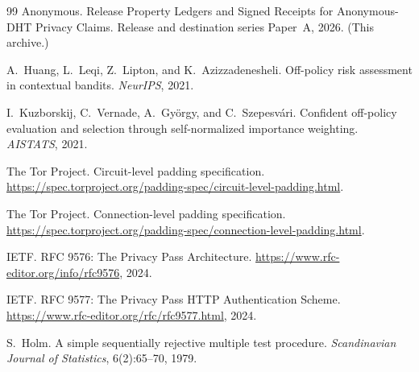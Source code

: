 \documentclass[11pt]{article}
\begin{document}
\begin{thebibliography}{99}
Anonymous.
\newblock Release Property Ledgers and Signed Receipts for Anonymous-DHT Privacy Claims.
\newblock Release and destination series Paper~A, 2026. (This archive.)


A.~Huang, L.~Leqi, Z.~Lipton, and K.~Azizzadenesheli.
\newblock Off-policy risk assessment in contextual bandits.
\newblock \emph{NeurIPS}, 2021.

I.~Kuzborskij, C.~Vernade, A.~Gy\"orgy, and C.~Szepesv\'ari.
\newblock Confident off-policy evaluation and selection through self-normalized importance weighting.
\newblock \emph{AISTATS}, 2021.

The Tor Project.
\newblock Circuit-level padding specification.
\newblock \url{https://spec.torproject.org/padding-spec/circuit-level-padding.html}.

The Tor Project.
\newblock Connection-level padding specification.
\newblock \url{https://spec.torproject.org/padding-spec/connection-level-padding.html}.

IETF.
\newblock RFC 9576: The Privacy Pass Architecture.
\newblock \url{https://www.rfc-editor.org/info/rfc9576}, 2024.

IETF.
\newblock RFC 9577: The Privacy Pass HTTP Authentication Scheme.
\newblock \url{https://www.rfc-editor.org/rfc/rfc9577.html}, 2024.

S.~Holm.
\newblock A simple sequentially rejective multiple test procedure.
\newblock \emph{Scandinavian Journal of Statistics}, 6(2):65--70, 1979.

\end{thebibliography}
\end{document}

